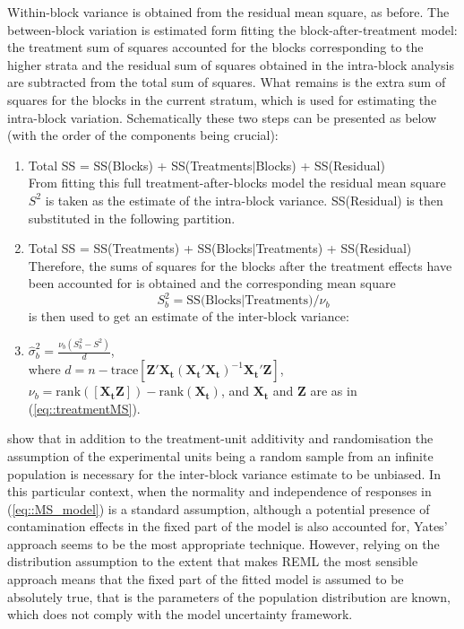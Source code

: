Within-block variance is obtained from the residual mean square, as before. The between-block variation is estimated form fitting the block-after-treatment model: the treatment sum of squares  accounted for the blocks corresponding to the higher strata and the residual sum of squares obtained in the intra-block analysis are subtracted from the total sum of squares. What remains is the extra sum of squares for the blocks in the current stratum, which is used for estimating the intra-block variation.
Schematically these two steps can be presented as below (with the order of the components being crucial):
\begin{enumerate}
\item Total SS = SS(Blocks) + SS(Treatments$\vert$Blocks) + SS(Residual)\\
From fitting this full treatment-after-blocks model the residual mean square $S^2$ is taken as the estimate of the intra-block variance. SS(Residual) is then substituted in the following partition.
\item Total SS = SS(Treatments) + SS(Blocks$\vert$Treatments) + SS(Residual)\\
Therefore, the sums of squares for the blocks after the treatment effects have been accounted for is obtained and the corresponding mean square $$S^2_{b}=\mbox{SS(Blocks$\vert$Treatments)}/\nu_{b}$$ is then used to get an estimate of the inter-block variance:
\item $\hat{\sigma}^2_{b}=\frac{\nu_{b}(S^2_{b}-S^2)}{d}$,\\
where $d=n-\mbox{trace}[\bm{Z}'\bm{X_t}(\bm{X_t}'\bm{X_t})^{-1}\bm{X_t}'\bm{Z}]$, $\nu_{b}=\mbox{rank}([\bm{X_t} \bm{Z}])-\mbox{rank}(\bm{X_t})$, and $\bm{X_t}$ and $\bm{Z}$ are as in (\ref{eq::treatmentMS}).
\end{enumerate}

\cite{GilmourGoos2016Robust} show that in addition to the treatment-unit additivity and randomisation the assumption of the experimental units being a random sample from an infinite population is necessary for the inter-block variance estimate to be unbiased. In this particular context, when the normality and independence of responses in (\ref{eq::MS_model}) is a standard assumption, although a potential presence of contamination effects in the fixed part of the model is also accounted for, Yates' approach seems to be the most appropriate technique. However, relying on the distribution assumption to the extent that makes REML the most sensible approach means that the fixed part of the fitted model is assumed to be absolutely true, that is the parameters of the population distribution are known, which does not comply with the model uncertainty framework. 

